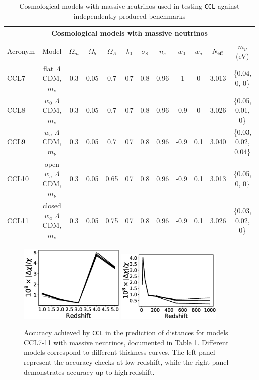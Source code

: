 \documentclass[\docopts]{\docclass}
\newcommand{\ccl}{{\tt CCL}\xspace}
\begin{document}
\begin{table}[t]
  \centering
  \begin{tabular}{ l c | c c c c c c c c c c }
    \hline
    \multicolumn{12}{|c|}{Cosmological models with massive neutrinos} \\
    \hline
    \hline
    Acronym & Model & $\Omega_m$ & $\Omega_b$ & $\Omega_\Lambda$ & $h_0$ & $\sigma_8$ & $n_s$ & $w_0$ & $w_a$ & $N_{\rm eff}$ & $m_\nu$ (eV) \\
    \hline
    CCL7 & flat $\Lambda$CDM, $m_\nu$ & 0.3 & 0.05 & 0.7 & 0.7 & 0.8 & 0.96 & -1 & 0 & 3.013 & \{0.04, 0, 0\} \\
    CCL8 & $w_0$ $\Lambda$CDM, $m_\nu$ & 0.3 & 0.05 & 0.7 & 0.7 & 0.8 & 0.96 & -0.9 & 0 & 3.026 & \{0.05, 0.01, 0\} \\
    CCL9 & $w_a$ $\Lambda$CDM, $m_\nu$ & 0.3 & 0.05 & 0.7 & 0.7 & 0.8 & 0.96 & -0.9 & 0.1 & 3.040 & \{0.03, 0.02, 0.04\} \\
    CCL10 & open $w_a$ $\Lambda$CDM, $m_\nu$ & 0.3 & 0.05 & 0.65 & 0.7 & 0.8 & 0.96 & -0.9 & 0.1 & 3.013 & \{0.05, 0, 0\}  \\
    CCL11 & closed $w_a$ $\Lambda$CDM, $m_\nu$ & 0.3 & 0.05 & 0.75 & 0.7 & 0.8 & 0.96 & -0.9 & 0.1 & 3.026 &\{0.03, 0.02, 0\} \\
    \hline
  \end{tabular}
  \caption{Cosmological models with massive neutrinos used in testing \ccl against independently produced benchmarks}
  \label{tab:cosmologies_nu}
\end{table}

\begin{figure}
  \centering
  \includegraphics[width=0.45\textwidth]{distances_mnu_low_z_class}
  \includegraphics[width=0.45\textwidth]{distances_mnu_high_z_class}
  \caption{Accuracy achieved by \ccl in the prediction of distances for models CCL7-11 with massive neutrinos, documented in Table \ref{tab:cosmologies_nu}. Different models correspond to different thickness curves. The left panel represent the accuracy checks at low redshift, while the right panel demonstrates accuracy up to high redshift.}
  \label{fig:distancegrow_nu}
\end{figure}
\end{document}
